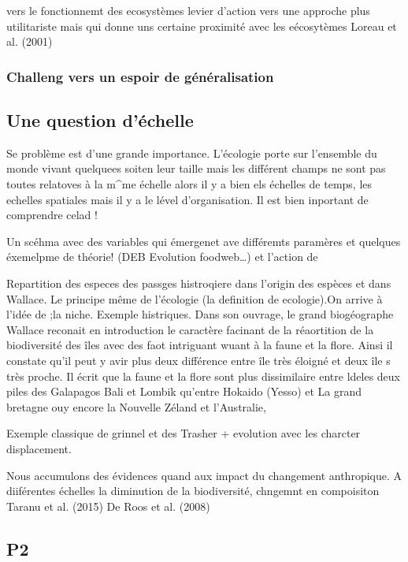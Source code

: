 vers le fonctionnemt des ecosystèmes levier d'action vers une approche
plus utilitariste mais qui donne uns certaine proximité avec les
eécosytèmes Loreau et al. (2001)

\subsubsection{Challeng vers un espoir de
généralisation}\label{challeng-vers-un-espoir-de-guxe9nuxe9ralisation}

\subsection{Une question d'échelle}\label{une-question-duxe9chelle-1}

Se problème est d'une grande importance. L'écologie porte sur l'ensemble
du monde vivant quelquees soiten leur taille mais les différent champs
ne sont pas toutes relatoves à la m\^{}me échelle alors il y a bien els
échelles de temps, les echelles spatiales mais il y a le lével
d'organisation. Il est bien inportant de comprendre celad !

Un scéhma avec des variables qui émergenet ave différemts paramères et
quelques éxemelpme de théorie! (DEB Evolution foodweb\ldots{}) et
l'action de

Repartition des especes des passges histroqiere dans l'origin des
espèces et dans Wallace. Le principe même de l'écologie (la definition
de ecologie).On arrive à l'idée de ;la niche. Exemple histriques. Dans
son ouvrage, le grand biogéographe Wallace reconait en introduction le
caractère facinant de la réaortition de la biodiversité des îles avec
des faot intriguant wuant à la faune et la flore. Ainsi il constate
qu'il peut y avir plus deux différence entre île très éloigné et deux
île s très proche. Il écrit que la faune et la flore sont plus
dissimilaire entre ldeles deux piles des Galapagos Bali et Lombik
qu'entre Hokaido (Yesso) et La grand bretagne ouy encore la Nouvelle
Zéland et l'Australie,

Exemple classique de grinnel et des Trasher + evolution avec les
charcter displacement.

Nous accumulons des évidences quand aux impact du changement
anthropique. A diiférentes échelles la diminution de la biodiversité,
chngemnt en compoisiton Taranu et al. (2015) De Roos et al. (2008)

\subsection{P2}\label{p2}

